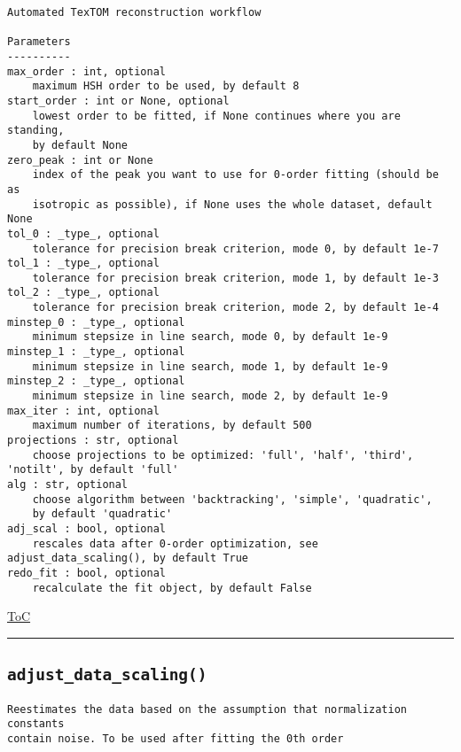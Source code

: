 \documentclass{article}
\begin{document}
\begin{lstlisting}[language=docstring]
Automated TexTOM reconstruction workflow

Parameters
----------
max_order : int, optional
    maximum HSH order to be used, by default 8    
start_order : int or None, optional
    lowest order to be fitted, if None continues where you are standing, 
    by default None
zero_peak : int or None
    index of the peak you want to use for 0-order fitting (should be as
    isotropic as possible), if None uses the whole dataset, default None
tol_0 : _type_, optional
    tolerance for precision break criterion, mode 0, by default 1e-7
tol_1 : _type_, optional
    tolerance for precision break criterion, mode 1, by default 1e-3
tol_2 : _type_, optional
    tolerance for precision break criterion, mode 2, by default 1e-4
minstep_0 : _type_, optional
    minimum stepsize in line search, mode 0, by default 1e-9
minstep_1 : _type_, optional
    minimum stepsize in line search, mode 1, by default 1e-9
minstep_2 : _type_, optional
    minimum stepsize in line search, mode 2, by default 1e-9
max_iter : int, optional
    maximum number of iterations, by default 500
projections : str, optional
    choose projections to be optimized: 'full', 'half', 'third', 'notilt', by default 'full'
alg : str, optional
    choose algorithm between 'backtracking', 'simple', 'quadratic', 
    by default 'quadratic'
adj_scal : bool, optional
    rescales data after 0-order optimization, see adjust_data_scaling(), by default True
redo_fit : bool, optional
    recalculate the fit object, by default False
\end{lstlisting}

\begin{flushright}

\hyperref[toc]{ToC}

\end{flushright}



\vspace{5mm}

\hrule

\subsection*{\texttt{adjust\_data\_scaling()}}
\label{fun:adjustdatascaling}

\begin{lstlisting}[language=docstring]
Reestimates the data based on the assumption that normalization constants
contain noise. To be used after fitting the 0th order
\end{lstlisting}
\end{document}
